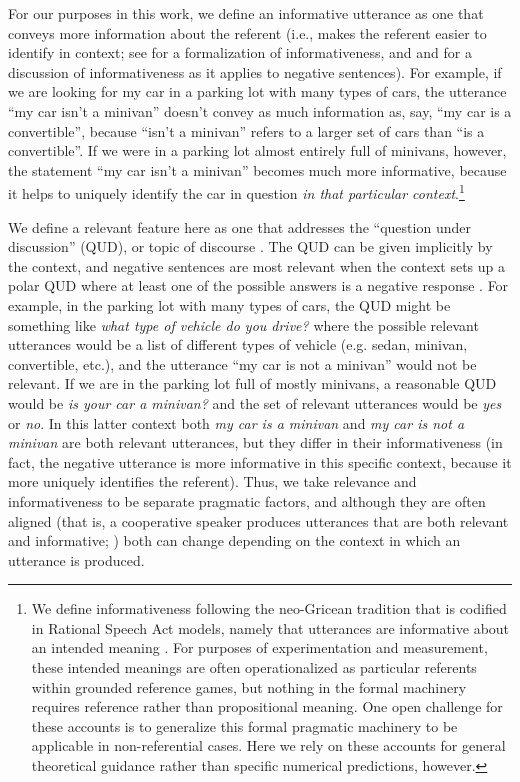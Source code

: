 \documentclass[man, floatsintext, noapacite]{apa6}
\begin{document}
For our purposes in this work, we define an informative utterance as one that conveys more information about the referent (i.e., makes the referent easier to identify in context; see  for a formalization of informativeness, and  and  for a discussion of informativeness as it applies to negative sentences). For example, if we are looking for my car in a parking lot with many types of cars, the utterance ``my car isn't a minivan'' doesn't convey as much information as, say, ``my car is a convertible'', because ``isn't a minivan'' refers to a larger set of cars than ``is a convertible''. If we were in a parking lot almost entirely full of minivans, however, the statement ``my car isn't a minivan'' becomes much more informative, because it helps to uniquely identify the car in question \textit{in that particular context}.\footnote{We define informativeness following the neo-Gricean tradition that is codified in Rational Speech Act models, namely that utterances are informative about an intended meaning \cite{goodman2016, frank2012}. For purposes of experimentation and measurement, these intended meanings are often operationalized as particular referents within grounded reference games, but nothing in the formal machinery requires reference rather than propositional meaning. One open challenge for these accounts is to generalize this formal pragmatic machinery to be applicable in non-referential cases. Here we rely on these accounts for general theoretical guidance rather than specific numerical predictions, however.} 

We define a relevant feature here as one that addresses the ``question under discussion'' (QUD), or topic of discourse \cite{roberts2012, vanrooy2003}. The QUD can be given implicitly by the context, and negative sentences are most relevant when the context sets up a polar QUD where at least one of the possible answers is a negative response \cite{xiang2020}. For example, in the parking lot with many types of cars, the QUD might be something like \textit{what type of vehicle do you drive?} where the possible relevant utterances would be a list of different types of vehicle (e.g. sedan, minivan, convertible, etc.), and the utterance ``my car is not a minivan'' would not be relevant. If we are in the parking lot full of mostly minivans, a reasonable QUD would be \textit{is your car a minivan?} and the set of relevant utterances would be \textit{yes} or \textit{no}. In this latter context both \textit{my car is a minivan} and \textit{my car is not a minivan} are both relevant utterances, but they differ in their informativeness (in fact, the negative utterance is more informative in this specific context, because it more uniquely identifies the referent). Thus, we take relevance and informativeness to be separate pragmatic factors, and although they are often aligned (that is, a cooperative speaker produces utterances that are both relevant and informative; ) both can change depending on the context in which an utterance is produced.
\end{document}
